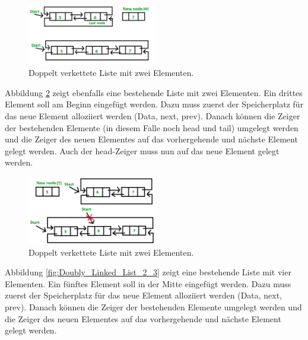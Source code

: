 \begin{figure}[h!]
	\centering
	\includegraphics[width=0.5\textwidth]{graphics/Doubly_Linked_List_2_1}
	\caption{Doppelt verkettete Liste mit zwei Elementen.}
	\label{fig:Doubly_Linked_List_2_1}
\end{figure}


Abbildung \ref{fig:Doubly_Linked_List_2_2} zeigt ebenfalls eine bestehende Liste mit zwei Elementen. Ein drittes Element soll am Beginn eingefügt werden. Dazu muss zuerst der Speicherplatz für das neue Element alloziiert werden (Data, next, prev). Danach können die Zeiger der bestehenden Elemente (in diesem Falle noch head und tail) umgelegt werden und die Zeiger des neuen Elementes auf das vorhergehende und nächste Element gelegt werden. Auch der head-Zeiger muss nun auf das neue Element gelegt werden.

\begin{figure}[h!]
	\centering
	\includegraphics[width=0.5\textwidth]{graphics/Doubly_Linked_List_2_2}
	\caption{Doppelt verkettete Liste mit zwei Elementen.}
	\label{fig:Doubly_Linked_List_2_2}
\end{figure}


Abbildung \ref{fig:Doubly_Linked_List_2_3} zeigt eine bestehende Liste mit vier Elementen. Ein fünftes Element soll in der Mitte eingefügt werden. Dazu muss zuerst der Speicherplatz für das neue Element alloziiert werden (Data, next, prev). Danach können die Zeiger der bestehenden Elemente umgelegt werden und die Zeiger des neuen Elementes auf das vorhergehende und nächste Element gelegt werden.


